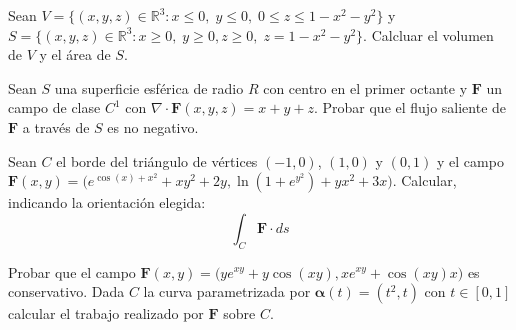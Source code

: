 
\begin{question}
    Sean  $V=\{ (x,y,z) \in \mathbb{R}^{3}:  x\leq 0, \;  y
        \leq 0, \;  0 \leq  z \leq 1-x^{2}-y^{2}  \}$ y
    $S=\{ (x,y,z) \in \mathbb{R}^{3}:  x\geq 0, \; y \geq 0,
        z\geq 0,\;  z = 1-x^{2}-y^{2}  \}$.
    Calcluar el volumen de $V$ y el \'area de $S$.
\end{question}


\begin{question}
    Sean  $S$ una superficie  esf\'erica de radio $R$ con
    centro en el primer octante  y  $\mathbf{F}$ un campo de
    clase $C^{1}$  con $\nabla\cdot\mathbf{F}(x,y,z) = x+y+z$.
    Probar que  el flujo saliente de $\mathbf{F}$ a trav\'es de
    $S$  es no negativo.
\end{question}


\begin{question}
    Sean  $C$ el borde del tri\'angulo de v\'ertices $(-1,0)$,
    $(1,0)$ y $(0,1)$ y el campo $\mathbf{F}(x,y) =
        \Big(e^{\cos(x)+x^{2}}+xy^{2}+2y, \ln(1+e^{y^{2}}) +yx^{2}+3x \Big).$
    Calcular,  indicando la orientaci\'on elegida:
    $$ \int_{C} \mathbf{F}\cdot ds$$
\end{question}


\begin{question}
    Probar que el campo $\mathbf{F}(x,y) = \Big(y e^{xy}+y\cos(xy)
        ,xe^{xy}+\cos(xy) x \Big)$ es conservativo.  Dada $C$ la curva
    parametrizada por $\boldsymbol{\alpha}(t) = (t^{2},t)$ con $t
        \in [0,1]$ calcular el trabajo realizado por $\mathbf{F}$ sobre $C.$
\end{question}

\newpage



